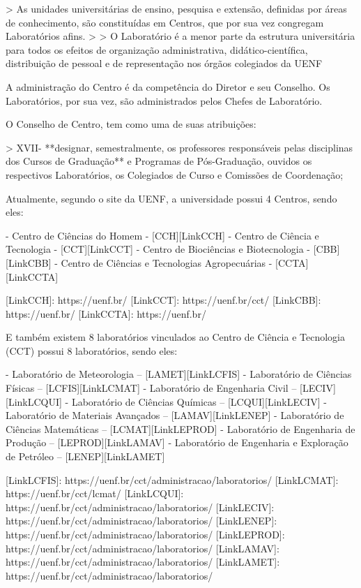     > As unidades universitárias de ensino, pesquisa e extensão, definidas por áreas de conhecimento, são constituídas em Centros, que por sua vez congregam Laboratórios afins.
    >
    > O Laboratório é a menor parte da estrutura universitária para todos os efeitos de organização administrativa, didático-científica, distribuição de pessoal e de representação nos órgãos colegiados da UENF

    A administração do Centro é da competência do Diretor e seu Conselho. Os Laboratórios, por sua vez, são administrados pelos Chefes de Laboratório.

    O Conselho de Centro, tem como uma de suas atribuições:

    > XVII- **designar, semestralmente, os professores responsáveis pelas disciplinas dos Cursos de Graduação** e Programas de Pós-Graduação, ouvidos os respectivos Laboratórios, os Colegiados de Curso e Comissões de Coordenação;

    Atualmente, segundo o site da UENF, a universidade possui 4 Centros, sendo eles:

    - Centro de Ciências do Homem - [CCH][LinkCCH]
    - Centro de Ciência e Tecnologia - [CCT][LinkCCT]
    - Centro de Biociências e Biotecnologia - [CBB][LinkCBB]
    - Centro de Ciências e Tecnologias Agropecuárias - [CCTA][LinkCCTA]

    [LinkCCH]: https://uenf.br/
    [LinkCCT]: https://uenf.br/cct/
    [LinkCBB]: https://uenf.br/
    [LinkCCTA]: https://uenf.br/

    E também existem 8 laboratórios vinculados ao Centro de Ciência e Tecnologia (CCT) possui 8 laboratórios, sendo eles:

    - Laboratório de Meteorologia – [LAMET][LinkLCFIS]
    - Laboratório de Ciências Físicas – [LCFIS][LinkLCMAT]
    - Laboratório de Engenharia Civil – [LECIV][LinkLCQUI]
    - Laboratório de Ciências Químicas – [LCQUI][LinkLECIV]
    - Laboratório de Materiais Avançados – [LAMAV][LinkLENEP]
    - Laboratório de Ciências Matemáticas – [LCMAT][LinkLEPROD]
    - Laboratório de Engenharia de Produção – [LEPROD][LinkLAMAV]
    - Laboratório de Engenharia e Exploração de Petróleo – [LENEP][LinkLAMET]

    [LinkLCFIS]: https://uenf.br/cct/administracao/laboratorios/
    [LinkLCMAT]: https://uenf.br/cct/lcmat/
    [LinkLCQUI]: https://uenf.br/cct/administracao/laboratorios/
    [LinkLECIV]: https://uenf.br/cct/administracao/laboratorios/
    [LinkLENEP]: https://uenf.br/cct/administracao/laboratorios/
    [LinkLEPROD]: https://uenf.br/cct/administracao/laboratorios/
    [LinkLAMAV]: https://uenf.br/cct/administracao/laboratorios/
    [LinkLAMET]: https://uenf.br/cct/administracao/laboratorios/

